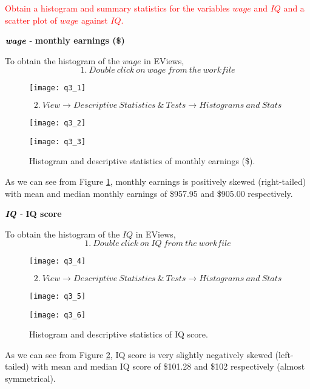\documentclass[12pt]{report}
\begin{document}
\noindent \textcolor{red}{Obtain a histogram and summary statistics for the variables $wage$ and $IQ$ and a scatter plot of $wage$ against $IQ$.}
\begin{center}
\noindent $\textbf{\textit{wage}}$ - \textbf{monthly earnings (\$)}
\end{center}
\noindent To obtain the histogram of the $wage$ in EViews,
$$1.\ Double\ click\ on\ wage\ from\ the\ workfile$$
\begin{figure}[H]
\centering
\texttt{[image: q3\_1]}
\end{figure}
\vspace{-\baselineskip}
$$2.\ View \to Descriptive\ Statistics\ \&\ Tests \to Histograms\ and\ Stats$$
\begin{figure}[H]
\centering
\texttt{[image: q3\_2]}
\end{figure}
\vspace{-\baselineskip}
\begin{figure}[H]
\centerline{\texttt{[image: q3\_3]}}
\caption{Histogram and descriptive statistics of monthly earnings (\$).}
\label{fig:hist1}
\end{figure}
\vspace{-\baselineskip}
\noindent As we can see from Figure \ref{fig:hist1}, monthly earnings is positively skewed (right-tailed) with mean and median monthly earnings of \$957.95 and \$905.00 respectively. \par
\begin{center}
$\textbf{\textit{IQ}}$ - \textbf{IQ score}
\end{center}
\noindent To obtain the histogram of the $IQ$ in EViews,
$$1.\ Double\ click\ on\ IQ\ from\ the\ workfile$$
\begin{figure}[H]
	\centering
	\texttt{[image: q3\_4]}
\end{figure}
\vspace{-\baselineskip}
$$2.\ View \to Descriptive\ Statistics\ \&\ Tests \to Histograms\ and\ Stats$$
\begin{figure}[H]
	\centering
	\texttt{[image: q3\_5]}
\end{figure}
\vspace{-\baselineskip}
\begin{figure}[H]
	\centerline{\texttt{[image: q3\_6]}}
	\caption{Histogram and descriptive statistics of IQ score.}
	\label{fig:hist2}
\end{figure}
\vspace{-\baselineskip}
\noindent As we can see from Figure \ref{fig:hist2}, IQ score is very slightly negatively skewed (left-tailed) with mean and median IQ score of \$101.28 and \$102 respectively (almost symmetrical). \par
\end{document}
